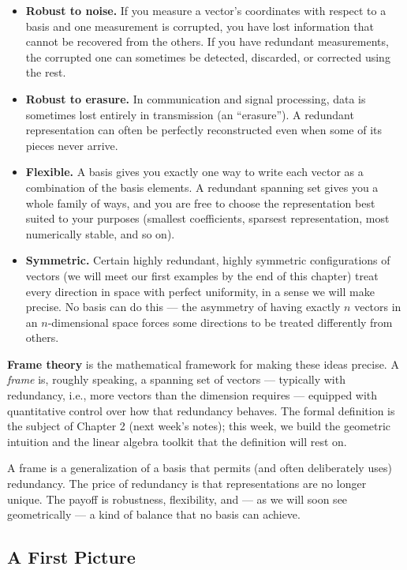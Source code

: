 \begin{itemize}
  \item \textbf{Robust to noise.} If you measure a vector's coordinates with respect to a basis and one measurement is corrupted, you have lost information that cannot be recovered from the others. If you have redundant measurements, the corrupted one can sometimes be detected, discarded, or corrected using the rest.
  \item \textbf{Robust to erasure.} In communication and signal processing, data is sometimes lost entirely in transmission (an ``erasure''). A redundant representation can often be perfectly reconstructed even when some of its pieces never arrive.
  \item \textbf{Flexible.} A basis gives you exactly one way to write each vector as a combination of the basis elements. A redundant spanning set gives you a whole family of ways, and you are free to choose the representation best suited to your purposes (smallest coefficients, sparsest representation, most numerically stable, and so on).
  \item \textbf{Symmetric.} Certain highly redundant, highly symmetric configurations of vectors (we will meet our first examples by the end of this chapter) treat every direction in space with perfect uniformity, in a sense we will make precise. No basis can do this --- the asymmetry of having exactly $n$ vectors in an $n$-dimensional space forces some directions to be treated differently from others.
\end{itemize}

\textbf{Frame theory} is the mathematical framework for making these ideas precise. A \emph{frame} is, roughly speaking, a spanning set of vectors --- typically with redundancy, i.e., more vectors than the dimension requires --- equipped with quantitative control over how that redundancy behaves. The formal definition is the subject of Chapter 2 (next week's notes); this week, we build the geometric intuition and the linear algebra toolkit that the definition will rest on.

\begin{keyidea}
A frame is a generalization of a basis that permits (and often deliberately uses) redundancy. The price of redundancy is that representations are no longer unique. The payoff is robustness, flexibility, and --- as we will soon see geometrically --- a kind of balance that no basis can achieve.
\end{keyidea}

\subsection{A First Picture}
\label{subsec:first-picture}

